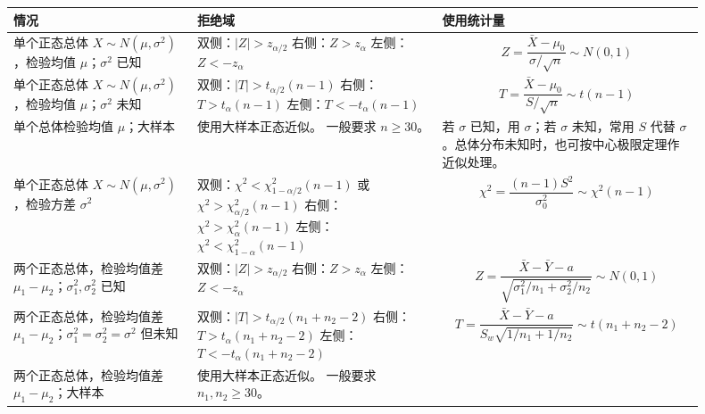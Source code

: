 \documentclass[UTF8,zihao=-4,fontset=fandol]{ctexart}
\begin{document}
\begin{longtable}{p{0.24\linewidth}p{0.32\linewidth}p{0.34\linewidth}}
\toprule
\textbf{情况} & \textbf{拒绝域} & \textbf{使用统计量} \\
\midrule
单个正态总体 $X\sim N(\mu,\sigma^2)$，检验均值 $\mu$；$\sigma^2$ 已知
&
双侧：$|Z|>z_{\alpha/2}$\newline
右侧：$Z>z_{\alpha}$\newline
左侧：$Z<-z_{\alpha}$
&
\[
Z=\frac{\bar{X}-\mu_0}{\sigma/\sqrt{n}}\sim N(0,1)
\]
\\
\addlinespace
单个正态总体 $X\sim N(\mu,\sigma^2)$，检验均值 $\mu$；$\sigma^2$ 未知
&
双侧：$|T|>t_{\alpha/2}(n-1)$\newline
右侧：$T>t_{\alpha}(n-1)$\newline
左侧：$T<-t_{\alpha}(n-1)$
&
\[
T=\frac{\bar{X}-\mu_0}{S/\sqrt{n}}\sim t(n-1)
\]
\\
\addlinespace
单个总体检验均值 $\mu$；大样本
&
使用大样本正态近似。\newline
一般要求 $n\ge 30$。
&
若 $\sigma$ 已知，用 $\sigma$；若 $\sigma$ 未知，常用 $S$ 代替 $\sigma$。总体分布未知时，也可按中心极限定理作近似处理。
\\
\addlinespace
单个正态总体 $X\sim N(\mu,\sigma^2)$，检验方差 $\sigma^2$
&
双侧：$\chi^2<\chi^2_{1-\alpha/2}(n-1)$ 或 $\chi^2>\chi^2_{\alpha/2}(n-1)$\newline
右侧：$\chi^2>\chi^2_{\alpha}(n-1)$\newline
左侧：$\chi^2<\chi^2_{1-\alpha}(n-1)$
&
\[
\chi^2=\frac{(n-1)S^2}{\sigma_0^2}\sim \chi^2(n-1)
\]
\\
\addlinespace
两个正态总体，检验均值差 $\mu_1-\mu_2$；$\sigma_1^2,\sigma_2^2$ 已知
&
双侧：$|Z|>z_{\alpha/2}$\newline
右侧：$Z>z_{\alpha}$\newline
左侧：$Z<-z_{\alpha}$
&
\[
Z=
\frac{\bar{X}-\bar{Y}-a}
{\sqrt{\sigma_1^2/n_1+\sigma_2^2/n_2}}
\sim N(0,1)
\]
\\
\addlinespace
两个正态总体，检验均值差 $\mu_1-\mu_2$；$\sigma_1^2=\sigma_2^2=\sigma^2$ 但未知
&
双侧：$|T|>t_{\alpha/2}(n_1+n_2-2)$\newline
右侧：$T>t_{\alpha}(n_1+n_2-2)$\newline
左侧：$T<-t_{\alpha}(n_1+n_2-2)$
&
\[
T=
\frac{\bar{X}-\bar{Y}-a}
{S_w\sqrt{1/n_1+1/n_2}}
\sim t(n_1+n_2-2)
\]
\\
\addlinespace
两个正态总体，检验均值差 $\mu_1-\mu_2$；大样本
&
使用大样本正态近似。\newline
一般要求 $n_1,n_2\ge 30$。

\end{longtable}
\end{document}
